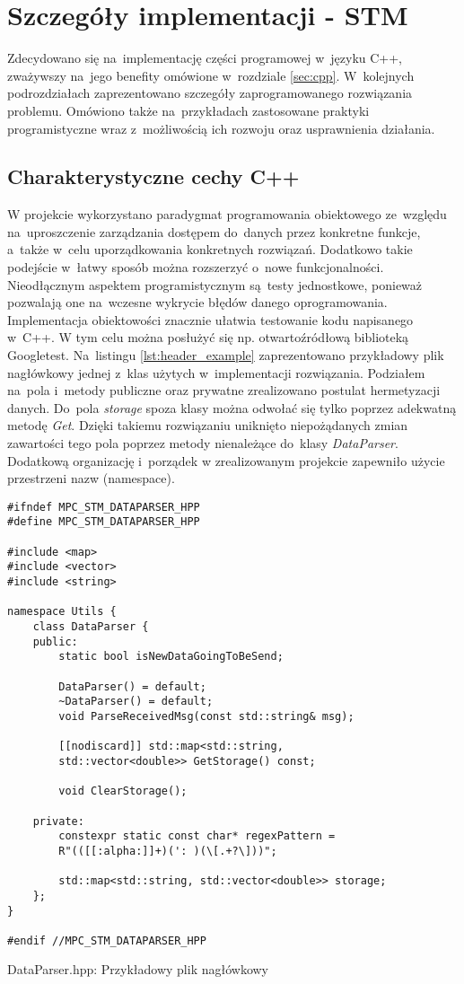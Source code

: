 \section{Szczegóły implementacji - STM} \label{sec:details-stm}
Zdecydowano się na~implementację części programowej w~języku C++, zważywszy na~jego benefity
omówione w~rozdziale \ref{sec:cpp}. W~kolejnych podrozdziałach zaprezentowano szczegóły
zaprogramowanego rozwiązania problemu. Omówiono także na~przykładach zastosowane praktyki
programistyczne wraz z~możliwością ich rozwoju oraz usprawnienia działania. 

\subsection{Charakterystyczne cechy C++} \label{sec:cpp_details}
W projekcie wykorzystano paradygmat programowania obiektowego ze~względu na~uproszczenie zarządzania
dostępem do~danych przez konkretne funkcje, a~także w~celu uporządkowania konkretnych rozwiązań.
Dodatkowo takie podejście w~łatwy sposób można rozszerzyć o~nowe funkcjonalności. Nieodłącznym 
aspektem programistycznym są~testy jednostkowe, ponieważ pozwalają one na~wczesne wykrycie błędów
danego oprogramowania. Implementacja obiektowości znacznie ułatwia testowanie kodu napisanego w~C++.
W tym celu można posłużyć się np. otwartoźródłową biblioteką Googletest. Na~listingu
\ref{lst:header_example} zaprezentowano przykładowy plik nagłówkowy jednej z~klas użytych w~implementacji
rozwiązania. Podziałem na~pola i~metody publiczne oraz prywatne zrealizowano
postulat hermetyzacji danych. Do~pola \textit{storage} spoza klasy można odwołać się tylko poprzez
adekwatną metodę \textit{Get}. Dzięki takiemu rozwiązaniu uniknięto niepożądanych zmian zawartości
tego pola poprzez metody nienależące do~klasy \textit{DataParser}. Dodatkową organizację i~porządek
w zrealizowanym projekcie zapewniło użycie przestrzeni nazw (namespace). \cite{cpp_bjarne}
\begin{listing}[htb]
\begin{verbatim}
#ifndef MPC_STM_DATAPARSER_HPP
#define MPC_STM_DATAPARSER_HPP

#include <map>
#include <vector>
#include <string>

namespace Utils {
    class DataParser {
    public:
        static bool isNewDataGoingToBeSend;

        DataParser() = default;
        ~DataParser() = default;
        void ParseReceivedMsg(const std::string& msg);

        [[nodiscard]] std::map<std::string,
        std::vector<double>> GetStorage() const;
        
        void ClearStorage();

    private:
        constexpr static const char* regexPattern = 
        R"(([[:alpha:]]+)(': )(\[.+?\]))";

        std::map<std::string, std::vector<double>> storage;
    };
}

#endif //MPC_STM_DATAPARSER_HPP
\end{verbatim}
\caption{DataParser.hpp: Przykładowy plik nagłówkowy}
\label{lst:header_example}
\end{listing}

